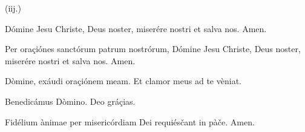 \prayerVersicleResponseGloriaPatri{}

\prayerText{}

 \hspace{0.5em} {\fmtPrayerRepeatText (iij.)}

\prayerVersicleResponseGloriaPatri

\newpage

\prayerText{}

\prayerVersicleResponse
{Dómine Jesu Christe, Deus noster, miserére nostri et salva nos.}
{Amen.}

\prayerText{}

\prayerVersicleResponseGloriaPatri{}

\prayerVersicleResponse
{Per oraçiónes sanctórum patrum nostrórum, Dómine Jesu Christe, Deus noster, miserére nostri et salva nos.}
{Amen.}

\prayerVersicleResponse
{Dòmine, exáudi oraçiónem meam.}
{Et clamor meus ad te vèniat.}

\prayerVersicleResponse
{Benedicámus Dòmino.}
{Deo gráçias.}

\prayerVersicleResponse
{Fidélium ànimae per misericórdiam Dei requiésčant in pàče.}
{Amen.}

\vfill

\begin{center}
\symbolCross
\end{center}

\vfill\vfill


